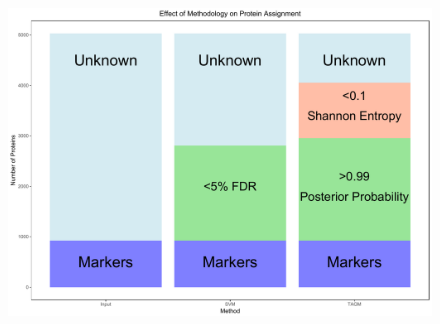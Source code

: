 \documentclass{beamer}
\theoremstyle{example}
\begin{document}
\begin{frame}{}
  \begin{figure}
    \includegraphics[width=.8\linewidth]{./figs/ConcludePlot.pdf}
  \end{figure}
\end{frame}
\end{document}
